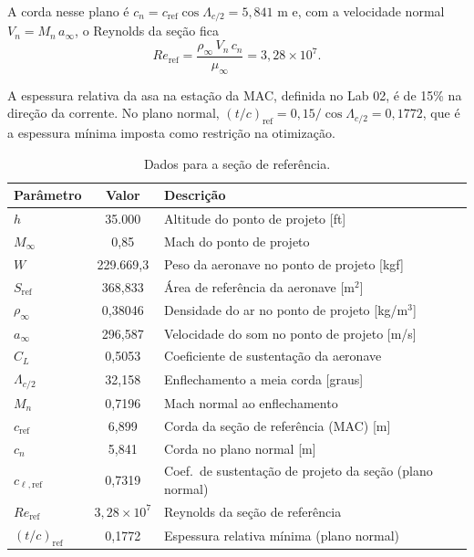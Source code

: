 A corda nesse plano é $c_n = c_{\mathrm{ref}}\cos\Lambda_{c/2} = 5{,}841$ m e,
com a velocidade normal $V_n = M_n\,a_\infty$, o Reynolds da seção fica
\begin{equation*}
    Re_{\mathrm{ref}} = \frac{\rho_\infty\,V_n\,c_n}{\mu_\infty}
        = 3{,}28 \times 10^{7}.
\end{equation*}

A espessura relativa da asa na estação da MAC, definida no Lab 02, é de 15\%
na direção da corrente. No plano normal,
$(t/c)_{\mathrm{ref}} = 0{,}15/\cos\Lambda_{c/2} = 0{,}1772$, que é a
espessura mínima imposta como restrição na otimização.

\begin{table}[H]
\centering
\caption{Dados para a seção de referência.}\label{tab:ref_section}
\renewcommand{\arraystretch}{1.25}
\begin{tabular}{lcl}
\toprule
Parâmetro & Valor & Descrição \\
\midrule
$h$                     & 35.000 & Altitude do ponto de projeto [ft] \\
$M_\infty$              & 0,85 & Mach do ponto de projeto \\
$W$                     & 229.669,3 & Peso da aeronave no ponto de projeto [kgf] \\
$S_{\mathrm{ref}}$      & 368,833 & Área de referência da aeronave [m$^2$] \\
$\rho_\infty$           & 0,38046 & Densidade do ar no ponto de projeto [kg/m$^3$] \\
$a_\infty$              & 296,587 & Velocidade do som no ponto de projeto [m/s] \\
$C_L$                   & 0,5053 & Coeficiente de sustentação da aeronave \\
$\Lambda_{c/2}$         & 32,158 & Enflechamento a meia corda [graus] \\
$M_n$                   & 0,7196 & Mach normal ao enflechamento \\
$c_{\mathrm{ref}}$      & 6,899 & Corda da seção de referência (MAC) [m] \\
$c_n$                   & 5,841 & Corda no plano normal [m] \\
$c_{\ell,\mathrm{ref}}$ & 0,7319 & Coef.\ de sustentação de projeto da seção (plano normal) \\
$Re_{\mathrm{ref}}$     & $3{,}28\times 10^{7}$ & Reynolds da seção de referência \\
$(t/c)_{\mathrm{ref}}$  & 0,1772 & Espessura relativa mínima (plano normal) \\
\bottomrule
\end{tabular}
\end{table}
